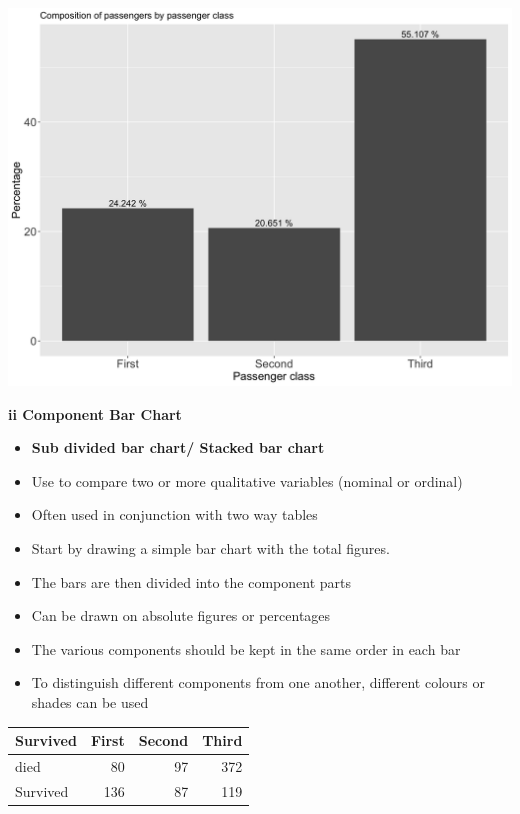 \documentclass[]{book}
\providecommand{\tightlist}{%
  \setlength{\itemsep}{0pt}\setlength{\parskip}{0pt}}
\begin{document}
\begin{center}\includegraphics[width=0.8\linewidth]{figure/box9-1} \end{center}

\textbf{ii Component Bar Chart }

\begin{itemize}
\tightlist
\item
  \textbf{Sub divided bar chart/ Stacked bar chart}
\item
  Use to compare two or more qualitative variables (nominal or ordinal)
\item
  Often used in conjunction with two way tables
\item
  Start by drawing a simple bar chart with the total figures.
\item
  The bars are then divided into the component parts
\item
  Can be drawn on absolute figures or percentages
\item
  The various components should be kept in the same order in each bar
\item
  To distinguish different components from one another, different colours or shades can be used
\end{itemize}

\begin{tabular}{l|r|r|r}
\hline
Survived & First & Second & Third\\
\hline
died & 80 & 97 & 372\\
\hline
Survived & 136 & 87 & 119\\
\hline
\end{tabular}
\end{document}
